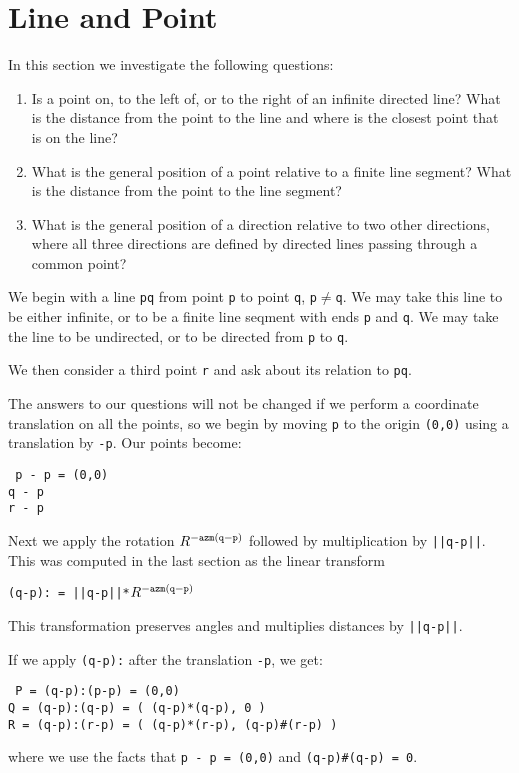 \documentclass[12pt]{article}
\begin{document}
\newpage

\section{Line and Point}\label{LINE-AND-POINT}
In this section we investigate the following questions:
\begin{enumerate}
\item Is a point on, to the left of, or to the right of
an infinite directed line?  What is the distance from the
point to the line and where is the closest point that is
on the line?
\item What is the general position of a point relative
to a finite line segment?  What is the distance from the
point to the line segment?
\item What is the general position of a direction relative
to two other directions, where all three directions are
defined by directed lines passing through a common point?
\end{enumerate}

We begin with a line {\tt pq} from point {\tt p} to point {\tt q},
{\tt p$\neq$q}.
We may take this line to be either infinite, or to be a finite
line seqment with ends {\tt p} and {\tt q}.  We may take the
line to be undirected, or to be directed from {\tt p} to {\tt q}.

We then consider a third point {\tt r} and ask about its relation
to {\tt pq}.

The answers to our questions will not be changed if we perform
a coordinate translation on all the points, so we begin by moving
{\tt p} to the origin {\tt (0,0)} using a translation by {\tt -p}.
Our points become:
\begin{center} \tt
p - p = (0,0) \\
q - p \\
r - p
\end{center}
Next we apply the rotation $R^{\tt -azm(q-p)}$
followed by multiplication by {\tt ||q-p||}.  This was computed
in the last section as the linear transform \\
\centerline{\tt (q-p): = ||q-p||*$R^{\tt -azm(q-p)}$}
This transformation preserves angles and multiplies distances by {\tt ||q-p||}.

If we apply {\tt (q-p):} after the translation {\tt -p}, we get:
\begin{center} \tt
P = (q-p):(p-p) = (0,0) \\
Q = (q-p):(q-p) = ( (q-p)*(q-p), 0 ) \\
R = (q-p):(r-p) = ( (q-p)*(r-p), (q-p)\#(r-p) )
\end{center}
where we use the facts that {\tt p - p = (0,0)} and
{\tt (q-p)\#(q-p) = 0}.
\end{document}
